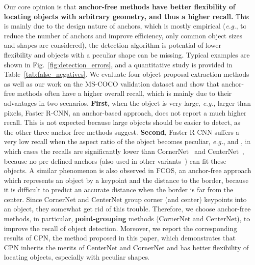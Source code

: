 \documentclass[runningheads]{llncs}
\begin{document}
Our core opinion is that \textbf{anchor-free methods have better flexibility of locating objects with arbitrary geometry, and thus a higher recall.} This is mainly due to the design nature of anchors, which is mostly empirical (\textit{e.g.}, to reduce the number of anchors and improve efficiency, only common object sizes and shapes are considered), the detection algorithm is potential of lower flexibility and objects with a peculiar shape can be missing. Typical examples are shown in Fig.~\ref{fig:detection_errors}, and a quantitative study is provided in Table~\ref{tab:false_negatives}. We evaluate four object proposal extraction methods as well as our work on the MS-COCO validation dataset and show that anchor-free methods often have a higher overall recall, which is mainly due to their advantages in two scenarios. \textbf{First}, when the object is very large, \textit{e.g.}, larger than  pixels, Faster R-CNN, an anchor-based approach, does not report a much higher recall. This is not expected because large objects should be easier to detect, as the other three anchor-free methods suggest. \textbf{Second}, Faster R-CNN suffers a very low recall when the aspect ratio of the object becomes peculiar, \textit{e.g.}, 
 and , in which cases the recalls are significantly lower than CornerNet~\cite{law2018cornernet} and CenterNet~\cite{duan2019centernet}, because no pre-defined anchors (also used in other variants~\cite{cai2018cascade,liu2016ssd,pang2019libra}) can fit these objects. A similar 
phenomenon is also observed in FCOS, an anchor-free approach which represents an object by a keypoint and the distance to the border, because it is difficult to predict an accurate distance when the border is far from the center. Since CornerNet and CenterNet group corner (and center) keypoints into an object, they somewhat get rid of this trouble.
Therefore, we choose anchor-free methods, in particular, \textbf{point-grouping} methods (CornerNet and CenterNet), to improve the recall of object detection. Moreover, we report the corresponding results of CPN, the method proposed in this paper, which demonstrates that CPN inherits the merits of CenterNet and CornerNet and has better flexibility of locating objects, especially with peculiar shapes.
\end{document}
